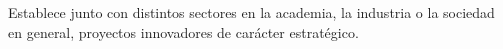 Establece junto con distintos sectores en la academia, la industria o
la sociedad en general, proyectos innovadores de car\'{a}cter estrat\'{e}gico.
